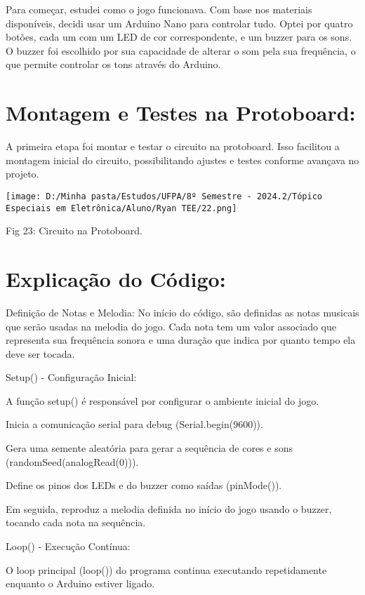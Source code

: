 \documentclass[
]{book}
\begin{document}
Para começar, estudei como o jogo funcionava. Com base nos materiais disponíveis, decidi usar um Arduino Nano para controlar tudo. Optei por quatro botões, cada um com um LED de cor correspondente, e um buzzer para os sons. O buzzer foi escolhido por sua capacidade de alterar o som pela sua frequência, o que permite controlar os tons através do Arduino.

\section{Montagem e Testes na Protoboard:}\label{montagem-e-testes-na-protoboard}

A primeira etapa foi montar e testar o circuito na protoboard. Isso facilitou a montagem inicial do circuito, possibilitando ajustes e testes conforme avançava no projeto.

\texttt{[image: D:/Minha pasta/Estudos/UFPA/8º Semestre - 2024.2/Tópico Especiais em Eletrônica/Aluno/Ryan TEE/22.png]}

Fig 23: Circuito na Protoboard.

\section{Explicação do Código:}\label{explicauxe7uxe3o-do-cuxf3digo}

Definição de Notas e Melodia: No início do código, são definidas as notas musicais que serão usadas na melodia do jogo. Cada nota tem um valor associado que representa sua frequência sonora e uma duração que indica por quanto tempo ela deve ser tocada.

Setup() - Configuração Inicial:

A função setup() é responsável por configurar o ambiente inicial do jogo.

Inicia a comunicação serial para debug (Serial.begin(9600)).

Gera uma semente aleatória para gerar a sequência de cores e sons (randomSeed(analogRead(0))).

Define os pinos dos LEDs e do buzzer como saídas (pinMode()).

Em seguida, reproduz a melodia definida no início do jogo usando o buzzer, tocando cada nota na sequência.

Loop() - Execução Contínua:

O loop principal (loop()) do programa continua executando repetidamente enquanto o Arduino estiver ligado.
\end{document}
